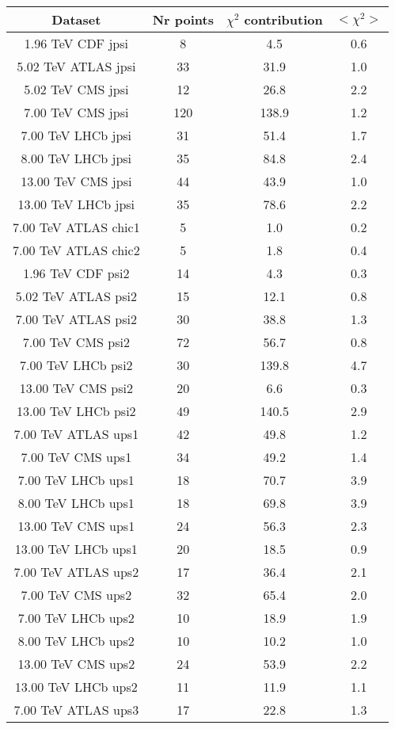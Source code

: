 \begin{table}[h!]
\centering
\begin{tabular}{c|c|c|c}
Dataset & Nr points & $\chi^2$ contribution & $<\chi^2>$ \\
\hline
1.96 TeV CDF jpsi & 8 & 4.5 & 0.6 \\
5.02 TeV ATLAS jpsi & 33 & 31.9 & 1.0 \\
5.02 TeV CMS jpsi & 12 & 26.8 & 2.2 \\
7.00 TeV CMS jpsi & 120 & 138.9 & 1.2 \\
7.00 TeV LHCb jpsi & 31 & 51.4 & 1.7 \\
8.00 TeV LHCb jpsi & 35 & 84.8 & 2.4 \\
13.00 TeV CMS jpsi & 44 & 43.9 & 1.0 \\
13.00 TeV LHCb jpsi & 35 & 78.6 & 2.2 \\
7.00 TeV ATLAS chic1 & 5 & 1.0 & 0.2 \\
7.00 TeV ATLAS chic2 & 5 & 1.8 & 0.4 \\
1.96 TeV CDF psi2 & 14 & 4.3 & 0.3 \\
5.02 TeV ATLAS psi2 & 15 & 12.1 & 0.8 \\
7.00 TeV ATLAS psi2 & 30 & 38.8 & 1.3 \\
7.00 TeV CMS psi2 & 72 & 56.7 & 0.8 \\
7.00 TeV LHCb psi2 & 30 & 139.8 & 4.7 \\
13.00 TeV CMS psi2 & 20 & 6.6 & 0.3 \\
13.00 TeV LHCb psi2 & 49 & 140.5 & 2.9 \\
7.00 TeV ATLAS ups1 & 42 & 49.8 & 1.2 \\
7.00 TeV CMS ups1 & 34 & 49.2 & 1.4 \\
7.00 TeV LHCb ups1 & 18 & 70.7 & 3.9 \\
8.00 TeV LHCb ups1 & 18 & 69.8 & 3.9 \\
13.00 TeV CMS ups1 & 24 & 56.3 & 2.3 \\
13.00 TeV LHCb ups1 & 20 & 18.5 & 0.9 \\
7.00 TeV ATLAS ups2 & 17 & 36.4 & 2.1 \\
7.00 TeV CMS ups2 & 32 & 65.4 & 2.0 \\
7.00 TeV LHCb ups2 & 10 & 18.9 & 1.9 \\
8.00 TeV LHCb ups2 & 10 & 10.2 & 1.0 \\
13.00 TeV CMS ups2 & 24 & 53.9 & 2.2 \\
13.00 TeV LHCb ups2 & 11 & 11.9 & 1.1 \\
7.00 TeV ATLAS ups3 & 17 & 22.8 & 1.3 \\

\end{tabular}
\end{table}
